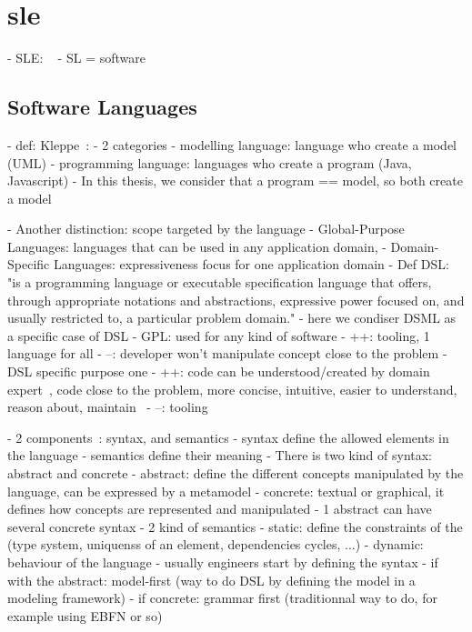 \section[Software Language Engineering]{\glsdesc{sle}}


- SLE: ~\cite{kleppe2008software}
- SL = software

\subsection{Software Languages}

- def: Kleppe~\cite{kleppe2008software}: 
- 2 categories
	- modelling language: language who create a model (UML)
	- programming language: languages who create a program (Java, Javascript)
- In this thesis, we consider that a program == model, so both create a model

- Another distinction: scope targeted by the language \cite{DBLP:journals/sigplan/DeursenKV00}
	- Global-Purpose Languages: languages that can be used in any application domain, 
	- Domain-Specific Languages: expressiveness focus for one application domain
- Def DSL: "is a programming language or executable specification language that offers, through appropriate notations and abstractions, expressive power focused on, and usually restricted to, a particular problem domain." \cite{DBLP:journals/sigplan/DeursenKV00}
	- here we condiser DSML as a specific case of DSL
- GPL: used for any kind of software
	- ++: tooling, 1 language for all
	- --: developer won't manipulate concept close to the problem
- DSL specific purpose one
	- ++: code can be understood/created by domain expert~\cite{DBLP:journals/sigplan/DeursenKV00}, code close to the problem, more concise, intuitive, easier to understand, reason about, maintain~\cite{DBLP:journals/smr/DeursenK98}
	- --: tooling~\cite{voelter2014generic}
	
- 2 components~\cite{DBLP:journals/computer/HarelR04}: syntax, and semantics
- syntax define the allowed elements in the language
- semantics define their meaning
- There is two kind of syntax: abstract and concrete
	- abstract: define the different concepts manipulated by the language, can be expressed by a metamodel
	- concrete: textual or graphical, it defines how concepts are represented and manipulated
	- 1 abstract can have several concrete syntax
- 2 kind of semantics
	- static: define the constraints of the (type system, uniquenss of an element, dependencies cycles, ...)
	- dynamic: behaviour of the language
- usually engineers start by defining the syntax
	- if with the abstract: model-first (way to do DSL by defining the model in a modeling framework)
	- if concrete: grammar first (traditionnal way to do, for example using EBFN or so) 
	

